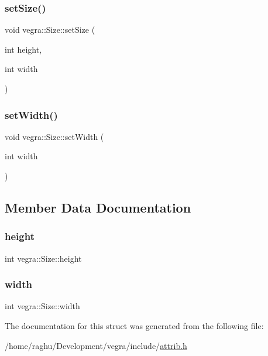 \subsubsection{\texorpdfstring{set\+Size()}{setSize()}}
{\footnotesize\ttfamily void vegra\+::\+Size\+::set\+Size (\begin{DoxyParamCaption}\item[{int}]{height,  }\item[{int}]{width }\end{DoxyParamCaption})\hspace{0.3cm}{\ttfamily [inline]}}

\mbox{\label{structvegra_1_1Size_a916716ce017fced6ec41612142289798}} 
\subsubsection{\texorpdfstring{set\+Width()}{setWidth()}}
{\footnotesize\ttfamily void vegra\+::\+Size\+::set\+Width (\begin{DoxyParamCaption}\item[{int}]{width }\end{DoxyParamCaption})\hspace{0.3cm}{\ttfamily [inline]}}



\subsection{Member Data Documentation}
\mbox{\label{structvegra_1_1Size_ab88c99e72a1579a2ac00f10133c5f23d}} 
\subsubsection{\texorpdfstring{height}{height}}
{\footnotesize\ttfamily int vegra\+::\+Size\+::height}

\mbox{\label{structvegra_1_1Size_ae71295e2c36b57cb0a71e4c4974ec753}} 
\subsubsection{\texorpdfstring{width}{width}}
{\footnotesize\ttfamily int vegra\+::\+Size\+::width}



The documentation for this struct was generated from the following file\+:\begin{DoxyCompactItemize}
\item 
/home/raghu/\+Development/vegra/include/\mbox{\hyperlink{attrib_8h}{attrib.\+h}}\end{DoxyCompactItemize}

